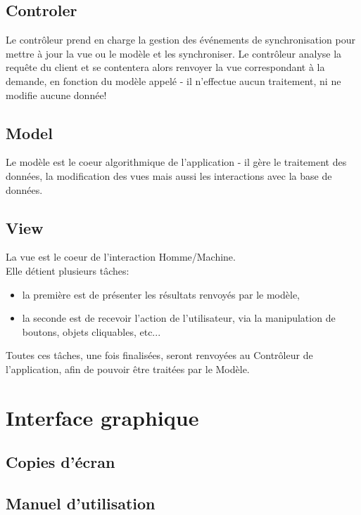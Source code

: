 \documentclass[pdftex,12pt,a4paper]{report}
\begin{document}
\begin{spacing}{1.2}
\subsection{Controler}

Le contrôleur prend en charge la gestion des événements de synchronisation pour mettre à jour la vue ou le modèle et les synchroniser. Le contrôleur analyse la requête du client et se contentera alors renvoyer la vue correspondant à la demande, en fonction du modèle appelé - il n'effectue aucun traitement, ni ne modifie aucune donnée!
\\

\subsection{Model}

Le modèle est le coeur algorithmique de l'application - il gère le traitement des données, la modification des vues mais aussi les interactions avec la base de données.

\subsection{View}

La vue est le coeur de l'interaction Homme/Machine.
\\
Elle détient plusieurs tâches:
\begin{itemize}
\item{la première est de présenter les résultats renvoyés par le modèle,}
\item{la seconde est de recevoir l'action de l'utilisateur, via la manipulation de boutons, objets cliquables, etc...}
\end{itemize}
Toutes ces tâches, une fois finalisées, seront renvoyées au Contrôleur de l'application, afin de pouvoir être traitées par le Modèle.

\section{Interface graphique}

\subsection{Copies d'écran}

\subsection{Manuel d'utilisation}


\end{spacing}
\end{document}
